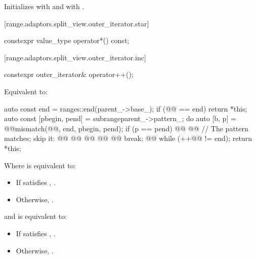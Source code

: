 \begin{itemdescr}
\pnum
\effects Initializes  with  and  with .
\end{itemdescr}

[range.adaptors.split_view.outer_iterator.star]{}

%
\begin{itemdecl}
constexpr value_type operator*() const;
\end{itemdecl}

\begin{itemdescr}
\pnum
\oldtxt{\returns}  
\end{itemdescr}

[range.adaptors.split_view.outer_iterator.inc]{}

%
\begin{itemdecl}
constexpr outer_iterator& operator++();
\end{itemdecl}

\begin{itemdescr}
\pnum
\effects Equivalent to:
\begin{codeblock}
auto const end = ranges::end(parent_->base_);
if (@@ == end) return *this;
auto const [pbegin, pend] = subrange{parent_->pattern_};
do {
  auto [b, p] = @@mismatch(@@, end, pbegin, pend);
  if (p == pend) @@ @\newtxt{\{}@
    // The pattern matches; skip it:
    @@
      @@
    @@
      @@
    @@
    break;
  @\newtxt{\}}@
} while (++@@ != end);
return *this;
\end{codeblock}
\end{itemdescr}

{\color{oldclr}
Where  is equivalent to:
\begin{itemize}
\item If  satisfies , .

\item Otherwise, .
\end{itemize}

and  is equivalent to:
\begin{itemize}
\item If  satisfies ,
.

\item Otherwise, .
\end{itemize}
} %

